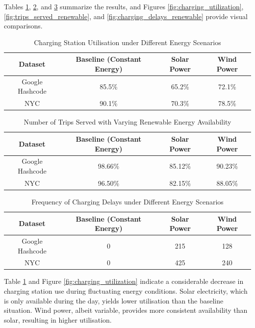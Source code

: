 Tables \ref{tab:charging_utilization}, \ref{tab:trips_served_renewable}, and \ref{tab:charging_delays_renewable} summarize the results, and Figures \ref{fig:charging_utilization}, \ref{fig:trips_served_renewable}, and \ref{fig:charging_delays_renewable} provide visual comparisons.

\begin{table}[htbp]
\caption{Charging Station Utilisation under Different Energy Scenarios}
\centering
\begin{tabular}{|c|c|c|c|}
\hline
\textbf{Dataset} & \textbf{Baseline (Constant Energy)} & \textbf{Solar Power} & \textbf{Wind Power} \\
\hline
Google Hashcode & 85.5\% & 65.2\% & 72.1\% \\
NYC & 90.1\% & 70.3\% & 78.5\% \\
\hline
\end{tabular}
\label{tab:charging_utilization}
\end{table}

\begin{table}[htbp]
\caption{Number of Trips Served with Varying Renewable Energy Availability}
\centering
\begin{tabular}{|c|c|c|c|}
\hline
\textbf{Dataset} & \textbf{Baseline (Constant Energy)} & \textbf{Solar Power} & \textbf{Wind Power} \\
\hline
Google Hashcode & 98.66\% & 85.12\% & 90.23\% \\
NYC & 96.50\% & 82.15\% & 88.05\% \\
\hline
\end{tabular}
\label{tab:trips_served_renewable}
\end{table}

\begin{table}[htbp]
\caption{Frequency of Charging Delays under Different Energy Scenarios}
\centering
\begin{tabular}{|c|c|c|c|}
\hline
\textbf{Dataset} & \textbf{Baseline (Constant Energy)} & \textbf{Solar Power} & \textbf{Wind Power} \\
\hline
Google Hashcode & 0 & 215 & 128 \\
NYC & 0 & 425 & 240 \\
\hline
\end{tabular}
\label{tab:charging_delays_renewable}
\end{table}

Table \ref{tab:charging_utilization} and Figure \ref{fig:charging_utilization} indicate a considerable decrease in charging station use during fluctuating energy conditions. Solar electricity, which is only available during the day, yields lower utilisation than the baseline situation. Wind power, albeit variable, provides more consistent availability than solar, resulting in higher utilisation.

